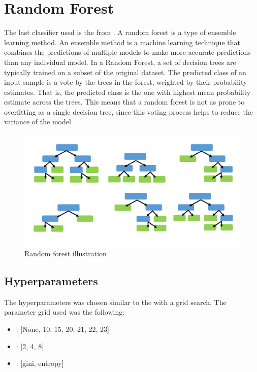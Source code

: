 \section{Random Forest}
The last classifier used is the  from .
A random forest is a type of ensemble learning method.
An ensemble method is a machine learning technique that combines the predictions of multiple models to make more accurate predictions than any individual model.
In a Random Forest, a set of decision trees are typically trained on a subset of the original dataset.
The predicted class of an input sample is a vote by the trees in the forest, weighted by their probability estimates.
That is, the predicted class is the one with highest mean probability estimate across the trees.
This means that a random forest is not as prone to overfitting as a single decision tree, since this voting process helps to reduce the variance of the model.

\begin{figure}[H]
    \centering
    \includegraphics[scale=0.3]{figures_for_report/random_forest_simple_example}
    \captionsetup{justification=centering,margin=2cm}
    \caption{Random forest illustration}\label{fig:figure}
\end{figure}


\subsection{Hyperparameters}\label{subsec:hyperparameters}
The hyperparameters was chosen similar to the  with a grid search.
The parameter grid used was the following:\\

\begin{center}
    \begin{minipage}{4in}
\begin{itemize}
    \item {}: [None, 10, 15, 20, 21, 22, 23]
    \item {}: [2, 4, 8]
    \item {}: [gini, entropy] \\
\end{itemize}
            \end{minipage}
\end{center}

